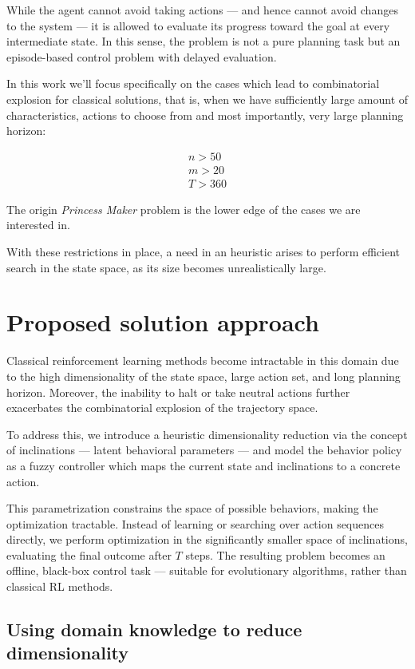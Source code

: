 \documentclass[11pt, a4paper]{article}
\begin{document}
	While the agent cannot avoid taking actions — and hence cannot avoid changes to the system — it is allowed to evaluate its progress toward the goal at every intermediate state.
	In this sense, the problem is not a pure planning task but an episode-based control problem with delayed evaluation.
	
	In this work we'll focus specifically on the cases which lead to combinatorial explosion for classical solutions, that is, when we have sufficiently large amount of characteristics, actions to choose from and most importantly, very large planning horizon:
	
	\begin{eqnarray}
		n > 50 \\
		m > 20 \\
		T > 360
	\end{eqnarray}
	
	The origin \textit{Princess Maker} problem is the lower edge of the cases we are interested in.

	With these restrictions in place, a need in an heuristic arises to perform efficient search in the state space, as its size becomes unrealistically large.
	
	\section{Proposed solution approach}

Classical reinforcement learning methods become intractable in this domain due to the high dimensionality of the state space, large action set, and long planning horizon. Moreover, the inability to halt or take neutral actions further exacerbates the combinatorial explosion of the trajectory space.

To address this, we introduce a heuristic dimensionality reduction via the concept of inclinations — latent behavioral parameters — and model the behavior policy as a fuzzy controller which maps the current state and inclinations to a concrete action.

This parametrization constrains the space of possible behaviors, making the optimization tractable. Instead of learning or searching over action sequences directly, we perform optimization in the significantly smaller space of inclinations, evaluating the final outcome after $T$ steps. The resulting problem becomes an offline, black-box control task — suitable for evolutionary algorithms, rather than classical RL methods.

	\subsection{Using domain knowledge to reduce dimensionality}
\end{document}

